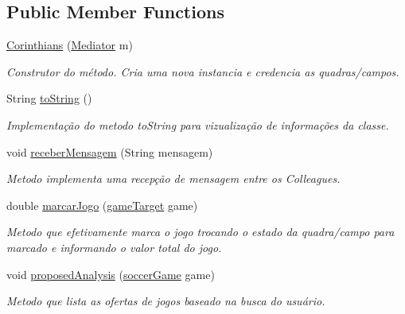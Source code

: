 \subsection*{Public Member Functions}
\begin{DoxyCompactItemize}
\item 
\mbox{\hyperlink{classmediator_pattern_1_1_corinthians_a50e5e0a5173a9118cb9b8d366a08c458}{Corinthians}} (\mbox{\hyperlink{interfacemediator_pattern_1_1_mediator}{Mediator}} m)
\begin{DoxyCompactList}\small\item\em Construtor do método. Cria uma nova instancia e credencia as quadras/campos. \end{DoxyCompactList}\item 
String \mbox{\hyperlink{classmediator_pattern_1_1_corinthians_a577a8ad3ad251a634cc7a7b59c9e64eb}{to\+String}} ()
\begin{DoxyCompactList}\small\item\em Implementação do metodo to\+String para vizualização de informações da classe. \end{DoxyCompactList}\item 
void \mbox{\hyperlink{classmediator_pattern_1_1_corinthians_a53bb404236663d65e9c6362cd2623ebd}{receber\+Mensagem}} (String mensagem)
\begin{DoxyCompactList}\small\item\em Metodo implementa uma recepção de mensagem entre os Colleagues. \end{DoxyCompactList}\item 
double \mbox{\hyperlink{classmediator_pattern_1_1_corinthians_a110ff6ae0a7adc0fac0601b836d6ad20}{marcar\+Jogo}} (\mbox{\hyperlink{interfaceadapter_pattern_1_1game_target}{game\+Target}} game)
\begin{DoxyCompactList}\small\item\em Metodo que efetivamente marca o jogo trocando o estado da quadra/campo para marcado e informando o valor total do jogo. \end{DoxyCompactList}\item 
void \mbox{\hyperlink{classmediator_pattern_1_1_corinthians_a22f96b98b3eb3c030c46c40641a4e782}{proposed\+Analysis}} (\mbox{\hyperlink{classtemplate_pattern_1_1soccer_game}{soccer\+Game}} game)
\begin{DoxyCompactList}\small\item\em Metodo que lista as ofertas de jogos baseado na busca do usuário. \end{DoxyCompactList}\end{DoxyCompactItemize}
